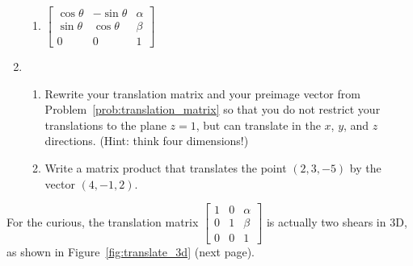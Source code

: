 \documentclass[../gatm.tex]{subfiles}
\begin{document}
\begin{enumerate}
\begin{multicols}{2}
\begin{enumerate}
\item $\left[\begin{array}{ccc} \cos\theta & -\sin\theta & \alpha \\ \sin\theta & \cos\theta & \beta \\ 0 & 0 & 1 \end{array}\right]$
\end{enumerate}
\end{multicols}
\item \begin{enumerate}
\item Rewrite your translation matrix and your preimage vector from Problem~\ref{prob:translation_matrix} so that you do not restrict your translations to the plane $z=1$, but can translate in the $x$, $y$, and $z$ directions. (Hint: think four dimensions!)
\item Write a matrix product that translates the point $(2,3,-5)$ by the vector $(4,-1,2)$.
\end{enumerate}
\end{enumerate}

For the curious, the translation matrix $\left[\begin{array}{ccc} 1 & 0 & \alpha \\ 0 & 1 & \beta \\ 0 & 0 & 1 \end{array}\right]$ is actually two shears in 3D, as shown in Figure~\ref{fig:translate_3d} (next page).
\end{document}
